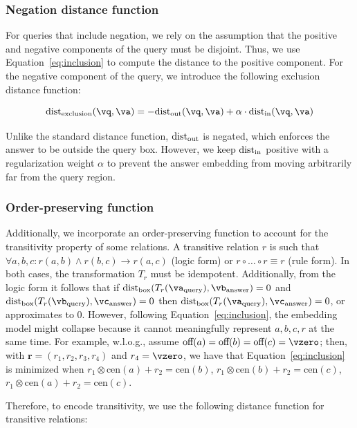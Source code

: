 \documentclass[runningheads]{llncs}
\newcommand{\cen}[1]{\mbox{cen}({#1})}
\newcommand{\off}[1]{\mbox{off}({#1})}
\newcommand{\relemb}[1]{\ensuremath{\bm{#1} = (#1_1, #1_2, #1_3, #1_4)}}
\newcommand{\dist}[1]{\mbox{dist}_{\scriptsize \mbox{#1}}}
\renewcommand{\paragraph}[1]{\subsubsection{#1}}
\begin{document}
\paragraph{Negation distance function}

For queries that include negation, we rely on the assumption that the
positive and negative components of the query must be disjoint. Thus,
we use Equation~\ref{eq:inclusion} to compute the distance to the
positive component. For the negative component of the query, we
introduce the following exclusion distance function:

\begin{equation}
  \label{eq:exclusion}
  \dist{exclusion}(\vq, \va) = -\dist{out}(\vq,\va) + \alpha \cdot \dist{in}(\vq,\va)
\end{equation}

Unlike the standard distance function, $\dist{out}$ is negated, which
enforces the answer to be outside the query box. However, we keep
$\dist{in}$ positive with a regularization weight $\alpha$ to prevent
the answer embedding from moving arbitrarily far from the query region.

\paragraph{Order-preserving function}

Additionally, we incorporate an order-preserving function to account
for the transitivity property of some relations. A transitive relation
$r$ is such that $\forall a,b,c: r(a,b) \land r(b,c) \to r(a,c)$
(logic form) or $r\circ \ldots \circ r \equiv r$ (rule form). In both
cases, the transformation $T_r$ must be idempotent. Additionally, from
the logic form it follows that if
$\dist{box}(T_r(\va_{\mbox{\scriptsize query}}),\vb_{\mbox{\scriptsize
    answer}})=0$ and
$\dist{box}(T_r(\vb_{\mbox{\scriptsize query}}),\vc_{\mbox{\scriptsize
    answer}})=0$ then
$\dist{box}(T_r(\va_{\mbox{\scriptsize query}}),\vc_{\mbox{\scriptsize
    answer}})=0$, or approximates
to $0$. However, following Equation~\ref{eq:inclusion}, the embedding
model might collapse because it cannot meaningfully represent
$a,b,c,r$ at the same time. For example, w.l.o.g., assume
$\off{a} = \off{b} = \off{c} = \vzero$; then, with $\relemb{r}$ and
$r_4=\vzero$, we have that Equation~\ref{eq:inclusion} is minimized
when $r_1\otimes \cen{a} + r_2=\cen{b}$,
$r_1\otimes \cen{b} + r_2=\cen{c}$,
$r_1\otimes \cen{a} + r_2=\cen{c}$.

  
Therefore, to encode transitivity, we use the following
distance function for transitive relations:
\end{document}
